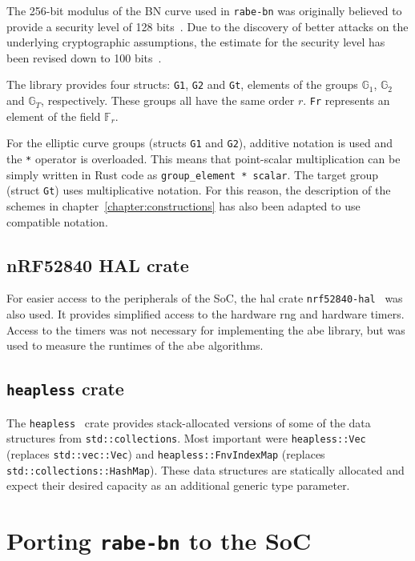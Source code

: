 The 256-bit modulus of the BN curve used in \texttt{rabe-bn} was originally believed to provide a security level of 128 bits~\cite{ben-sasson_succinct_2013}. 
Due to the discovery of better attacks on the underlying cryptographic assumptions, the estimate for the security level has been revised down to 100 bits~\cite{yonezawa_pairing-friendly_2019}.

The library provides four structs: \texttt{G1}, \texttt{G2} and \texttt{Gt}, elements of the groups $\mathbb{G}_1$, $\mathbb{G}_2$ and $\mathbb{G}_T$, respectively.
These groups all have the same order $r$.
\texttt{Fr} represents an element of the field $\mathbb{F}_r$.

For the elliptic curve groups (structs \texttt{G1} and \texttt{G2}), additive notation is used and the \texttt{*} operator is overloaded.
This means that point-scalar multiplication can be simply written in Rust code as \verb$group_element * scalar$.
The target group (struct \texttt{Gt}) uses multiplicative notation.
For this reason, the description of the schemes in chapter~\ref{chapter:constructions} has also been adapted to use compatible notation.

\subsection*{nRF52840 HAL crate}
For easier access to the peripherals of the SoC, the \acrfull{hal} \gls{crate} \texttt{nrf52840-hal}~\cite{noauthor_nrf52840-hal_nodate} was also used.
It provides simplified access to the hardware \acrfull{rng} and hardware timers.
Access to the timers was not necessary for implementing the \acrshort{abe} library, but was used to measure the runtimes of the \acrshort{abe} algorithms.

\subsection*{\texttt{heapless} crate}
The \texttt{heapless}~\cite{aparicio_heapless_nodate} crate provides stack-allocated versions of some of the data structures from \texttt{std::collections}. 
Most important were \texttt{heapless::Vec} (replaces \texttt{std::vec::Vec}) and \texttt{heapless::FnvIndexMap} (replaces \texttt{std::collections::HashMap}).
These data structures are statically allocated and expect their desired capacity as an additional generic type parameter.

\section{Porting \texttt{rabe-bn} to the SoC}

